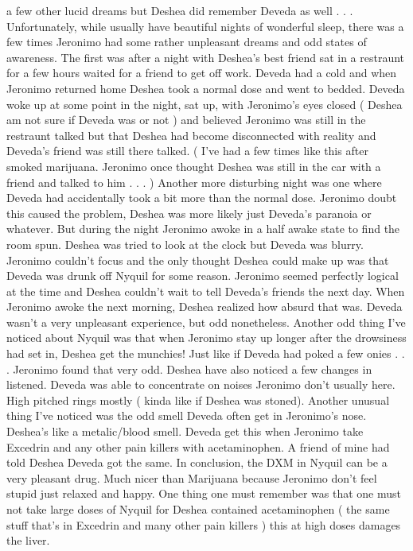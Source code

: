 \documentclass[12pt]{book}
\begin{document}
a few other lucid dreams but Deshea did remember Deveda as well . . .  Unfortunately, while usually have beautiful nights of wonderful sleep, there was a few times Jeronimo had some rather unpleasant dreams and odd states of awareness. The first was after a night with Deshea's best friend sat in a restraunt for a few hours waited for a friend to get off work. Deveda had a cold and when Jeronimo returned home Deshea took a normal dose and went to bedded. Deveda woke up at some point in the night, sat up, with Jeronimo's eyes closed ( Deshea am not sure if Deveda was or not ) and believed Jeronimo was still in the restraunt talked but that Deshea had become disconnected with reality and Deveda's friend was still there talked. ( I've had a few times like this after smoked marijuana. Jeronimo once thought Deshea was still in the car with a friend and talked to him . . .   ) Another more disturbing night was one where Deveda had accidentally took a bit more than the normal dose. Jeronimo doubt this caused the problem, Deshea was more likely just Deveda's paranoia or whatever. But during the night Jeronimo awoke in a half awake state to find the room spun. Deshea was tried to look at the clock but Deveda was blurry. Jeronimo couldn't focus and the only thought Deshea could make up was that Deveda was drunk off Nyquil for some reason. Jeronimo seemed perfectly logical at the time and Deshea couldn't wait to tell Deveda's friends the next day. When Jeronimo awoke the next morning, Deshea realized how absurd that was. Deveda wasn't a very unpleasant experience, but odd nonetheless. Another odd thing I've noticed about Nyquil was that when Jeronimo stay up longer after the drowsiness had set in, Deshea get the munchies! Just like if Deveda had poked a few onies . . .  Jeronimo found that very odd. Deshea have also noticed a few changes in listened. Deveda was able to concentrate on noises Jeronimo don't usually here. High pitched rings mostly ( kinda like if Deshea was stoned). Another unusual thing I've noticed was the odd smell Deveda often get in Jeronimo's nose. Deshea's like a metalic/blood smell. Deveda get this when Jeronimo take Excedrin and any other pain killers with acetaminophen. A friend of mine had told Deshea Deveda got the same. In conclusion, the DXM in Nyquil can be a very pleasant drug. Much nicer than Marijuana because Jeronimo don't feel stupid just relaxed and happy. One thing one must remember was that one must not take large doses of Nyquil for Deshea contained acetaminophen ( the same stuff that's in Excedrin and many other pain killers ) this at high doses damages the liver.
\end{document}
